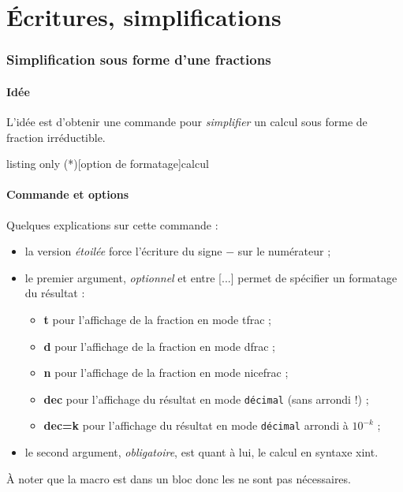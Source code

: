 \documentclass[a4paper,french,11pt]{article}
\newcommand\ctex[1]{\tcbox[vignettelatex]{#1}}
\newcommand\cmaj[1]{%
	{\tcbox[vignetteMaJ]{#1}\xspace}%
}
\newcommand\Cle[1]{{\bfseries\sffamily\textlangle #1\textrangle}}
\begin{document}
\newpage

\part{Écritures, simplifications}

\section{Simplification sous forme d'une fractions}\label{convfrac}

\subsection{Idée}

\begin{tipblock}
L'idée est d'obtenir une commande pour \textit{simplifier} un calcul sous forme de fraction irréductible.
\end{tipblock}

\begin{PresCodeTexPL}{listing only}
\ConversionFraction(*)[option de formatage]{calcul}
\end{PresCodeTexPL}

\subsection{Commande et options}

\begin{cautionblock}
Quelques explications sur cette commande :

\begin{itemize}
	\item \cmaj{2.5.1} la version \textit{étoilée} force l'écriture du signe \og $-$ \fg{} sur le numérateur ;
	\item le premier argument, \textit{optionnel} et entre \textsf{[...]} permet de spécifier un formatage du résultat :
	\begin{itemize}
		\item \Cle{t} pour l'affichage de la fraction en mode \textsf{tfrac} ;
		\item \Cle{d} pour l'affichage de la fraction en mode \textsf{dfrac} ;
		\item \Cle{n} pour l'affichage de la fraction en mode \textsf{nicefrac} ;
		\item \Cle{dec} pour l'affichage du résultat en mode \texttt{décimal} (sans arrondi !) ;
		\item \Cle{dec=k} pour l'affichage du résultat en mode \texttt{décimal} arrondi à $10^{-k}$ ;
	\end{itemize}
	\item le second argument, \textit{obligatoire}, est quant à lui, le calcul en syntaxe \textsf{xint}.
\end{itemize}

À noter que la macro est dans un bloc \ctex{ensuremath} donc les \ctex{\$...\$} ne sont pas nécessaires.
\end{cautionblock}
\end{document}
